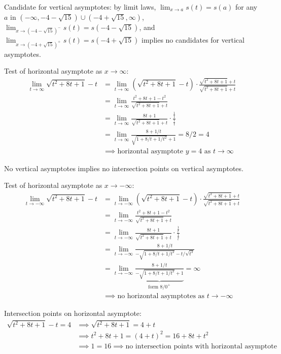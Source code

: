 \documentclass[nooutcomes]{ximera}
\begin{document}
\begin{problem}
\begin{itemize}
      Candidate for vertical asymptotes: by limit laws, $\lim_{x \to a} s(t) = s(a)$ for any $a$ in $(-\infty, -4 -\sqrt{15}) \cup (-4+\sqrt{15}, \infty)$, $\lim_{x \to (-4 -\sqrt{15})^-} s(t) = s(-4 -\sqrt{15})$, and $\lim_{x \to (-4 +\sqrt{15})^+} s(t) = s(-4 +\sqrt{15})$ implies no candidates for vertical asymptotes.

      Test of horizontal asymptote as $x \to \infty$:
      \begin{align*}
        \lim_{t \to \infty} \sqrt{t^2 +  8t + 1} - t
        &= \lim_{t \to \infty} (\sqrt{t^2 + 8t + 1} - t) \cdot \frac{\sqrt{t^2 + 8t + 1} + t}{\sqrt{t^2 + 8t + 1} + t}\\
          &= \lim_{t \to \infty} \frac{t^2 + 8t + 1 - t^2}{\sqrt{t^2 + 8t + 1} + t}\\
          &= \lim_{t \to \infty} \frac{8t + 1}{\sqrt{t^2 + 8t + 1} + t} \cdot \frac{\frac{1}{t}}{\frac{1}{t}} \\
          &= \lim_{t \to \infty} \frac{8 + 1/t}{\sqrt{1 + 8/t + 1/t^2} + 1} = 8/2 = 4\\
        &\implies \mbox{horizontal asymptote $y = 4$ as $t \to \infty$}
        \end{align*}

      No vertical asymptotes implies no intersection points on vertical asymptotes.

      Test of horizontal asymptote as $x \to -\infty$:
      \begin{align*}
        \lim_{t \to -\infty} \sqrt{t^2 +  8t + 1} - t
        &= \lim_{t \to -\infty} (\sqrt{t^2 + 8t + 1} - t) \cdot \frac{\sqrt{t^2 + 8t + 1} + t}{\sqrt{t^2 + 8t + 1} + t}\\
          &= \lim_{t \to -\infty} \frac{t^2 + 8t + 1 - t^2}{\sqrt{t^2 + 8t + 1} + t}\\
          &= \lim_{t \to -\infty} \frac{8t + 1}{\sqrt{t^2 + 8t + 1} + t} \cdot \frac{\frac{1}{t}}{\frac{1}{t}} \\
          &= \lim_{t \to -\infty} \frac{8 + 1/t}{-\sqrt{1 + 8/t + 1/t^2} - t/\sqrt{t^2}}\\
        &= \lim_{t \to -\infty} \underbrace{\frac{8 + 1/t}{-\sqrt{1 + 8/t + 1/t^2} +1}}_\text{form $8/0^+$} = \infty\\
        &\implies \mbox{no horizontal asymptotes as $t \to -\infty$}
        \end{align*}
        
     Intersection points on horizontal asymptote:
     \begin{align}
       \sqrt{t^2 + 8t + 1} - t = 4 &\implies \sqrt{t^2 + 8t + 1} = 4 + t\\
       &\implies t^2 + 8t + 1 = (4 + t)^2 = 16 + 8t + t^2\\
       &\implies 1 = 16 \implies \mbox{no intersection points with horizontal asymptote}
     \end{align}
  \end{itemize}
\end{problem}
\end{document}
